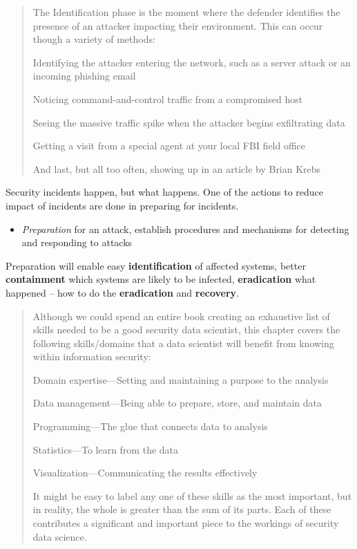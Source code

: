 \documentclass[Screen16to9,17pt]{foils}
\begin{document}


\begin{quote}
The Identification phase is the moment where the defender identifies the presence of
an attacker impacting their environment. This can occur though a variety of methods:
\begin{list2}
\item Identifying the attacker entering the network, such as a server attack or an
incoming phishing email
\item  Noticing command-and-control traffic from a compromised host
\item  Seeing the massive traffic spike when the attacker begins exfiltrating data
\item  Getting a visit from a special agent at your local FBI field office
\item  And last, but all too often, showing up in an article by Brian Krebs
\end{list2}
\end{quote}





Security incidents happen, but what happens. One of the actions to reduce impact of incidents are done in preparing for incidents.

\begin{itemize}
\item \emph{Preparation} for an attack, establish procedures and mechanisms for detecting and responding to attacks
\end{itemize}

Preparation will enable easy {\bf identification} of affected systems, better {\bf containment} which systems are likely to be infected, {\bf eradication} what happened -- how to do the {\bf eradication} and {\bf recovery}.


\begin{quote}
Although we could spend an entire book creating an exhaustive list of skills needed to be a good security data scientist, this chapter covers the following skills/domains that a data scientist will benefit from
knowing within information security:
\begin{list2}
\item Domain expertise—Setting and maintaining a purpose to the analysis
\item Data management—Being able to prepare, store, and maintain data
\item Programming—The glue that connects data to analysis
\item Statistics—To learn from the data
\item Visualization—Communicating the results effectively
\end{list2}
It might be easy to label any one of these skills as the most important, but in reality, the whole is greater than the sum of its parts. Each of these contributes a significant and important piece to the workings of
security data science.
\end{quote}
\end{document}
